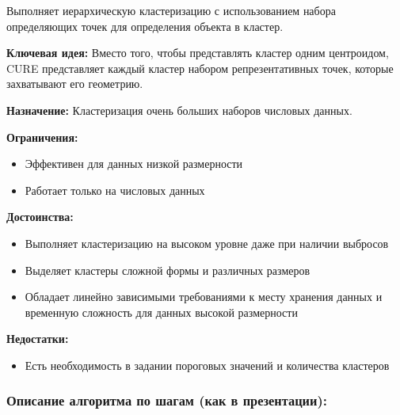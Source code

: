 \documentclass[11pt]{article}
\begin{document}
Выполняет иерархическую кластеризацию с использованием набора определяющих точек для определения объекта в кластер.

\textbf{Ключевая идея:} Вместо того, чтобы представлять кластер одним центроидом, CURE представляет каждый кластер набором репрезентативных точек, которые захватывают его геометрию.

\textbf{Назначение:} Кластеризация очень больших наборов числовых данных.

\textbf{Ограничения:}
\begin{itemize}
    \item Эффективен для данных низкой размерности
    \item Работает только на числовых данных
\end{itemize}

\textbf{Достоинства:}
\begin{itemize}
    \item Выполняет кластеризацию на высоком уровне даже при наличии выбросов
    \item Выделяет кластеры сложной формы и различных размеров
    \item Обладает линейно зависимыми требованиями к месту хранения данных и временную сложность для данных высокой размерности
\end{itemize}

\textbf{Недостатки:}
\begin{itemize}
    \item Есть необходимость в задании пороговых значений и количества кластеров
\end{itemize}

\subsubsection{Описание алгоритма по шагам (как в презентации):}
\end{document}
